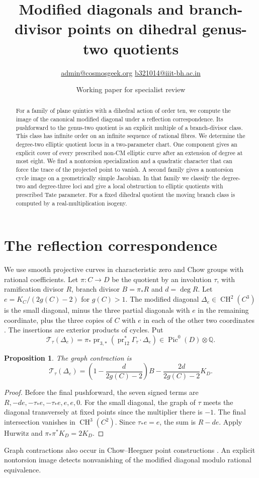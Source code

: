 \documentclass[11pt]{article}
\title{Modified diagonals and branch-divisor points on dihedral genus-two quotients}
\author{\small\href{mailto:admin@cosmosgeek.org}{admin@cosmosgeek.org}\qquad
\href{mailto:b321014@iiit-bh.ac.in}{b321014@iiit-bh.ac.in}}
\date{Working paper for specialist review}
\newtheorem{proposition}[theorem]{Proposition}
\newcommand{\Pic}{\operatorname{Pic}}
\newcommand{\CH}{\operatorname{CH}}
\newcommand{\Q}{\mathbb Q}
\begin{document}
\maketitle
\begin{abstract}
For a family of plane quintics with a dihedral action of order ten, we compute
the image of the canonical modified diagonal under a reflection correspondence.
Its pushforward to the genus-two quotient is an explicit multiple of a
branch-divisor class. This class has infinite order on an infinite sequence
of rational fibres. We determine the degree-two elliptic quotient locus
in a two-parameter chart. One component gives an explicit cover of every
prescribed non-CM elliptic curve after an extension of degree at most eight.
We find a nontorsion specialization and a quadratic character that can force
the trace of the projected point to vanish. A second family gives a
nontorsion cycle image on a geometrically simple Jacobian. In that family
we classify the degree-two and degree-three loci and give a local obstruction
to elliptic quotients with prescribed Tate parameter. For a fixed dihedral
quotient the moving branch class is computed by a real-multiplication isogeny.
\end{abstract}
\section{The reflection correspondence}
We use smooth projective curves in characteristic zero and Chow groups with
rational coefficients. Let $\pi:C\to D$ be the quotient by an involution
$\tau$, with ramification divisor $R$, branch divisor $B=\pi_*R$ and
$d=\deg R$. Let $e=K_C/(2g(C)-2)$ for $g(C)>1$. The modified diagonal
$\Delta_e\in\CH^2(C^3)$ is the small diagonal, minus the three partial
diagonals with $e$ in the remaining coordinate, plus the three copies of
$C$ with $e$ in each of the other two coordinates \cite{GS}. The insertions
are exterior products of cycles. Put
\[
 \mathcal T_\tau(\Delta_e)=\pi_*\operatorname{pr}_{3,*}
       (\operatorname{pr}_{12}^*\Gamma_\tau\cdot\Delta_e)
 \in\Pic^0(D)\otimes\Q .
\]
\begin{proposition}\label{graph}
The graph contraction is
\[
 \mathcal T_\tau(\Delta_e)=
 \left(1-\frac d{2g(C)-2}\right)B-
 \frac{2d}{2g(C)-2}K_D .
\]
\end{proposition}
\begin{proof}
Before the final pushforward, the seven signed terms are
$R,-de,-\tau_*e,-\tau_*e,e,e,0$. For the small diagonal, the graph of
$\tau$ meets the diagonal transversely at fixed points since the multiplier
there is $-1$. The final intersection vanishes in $\CH^3(C^2)$. Since
$\tau_*e=e$, the sum is $R-de$. Apply Hurwitz and
$\pi_*\pi^*K_D=2K_D$.
\end{proof}
Graph contractions also occur in Chow--Heegner point constructions
\cite{CH}. An explicit nontorsion image detects nonvanishing of the
modified diagonal modulo rational equivalence.
\end{document}
